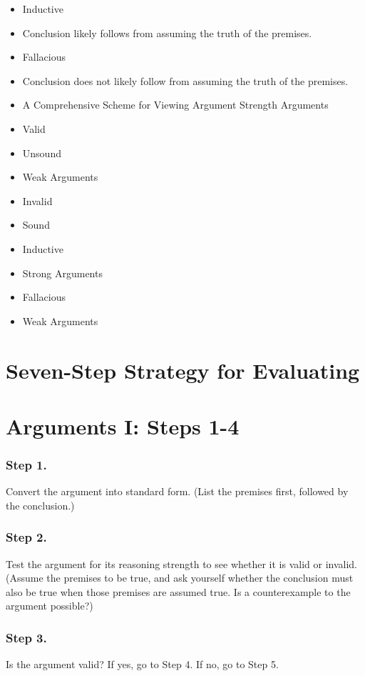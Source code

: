 \documentclass{article}
\begin{document}
      \begin{itemize}
        \item Inductive
        \item Conclusion likely follows from assuming the truth of the premises.
        \item Fallacious
        \item Conclusion does not likely follow from assuming the truth of the premises.
        \item A Comprehensive Scheme for Viewing Argument Strength Arguments
        \item Valid
        \item Unsound
        \item Weak Arguments
        \item Invalid
        \item Sound
        \item Inductive
        \item Strong Arguments
        \item Fallacious
        \item Weak Arguments

      \end{itemize}
  \section{Seven-Step Strategy for Evaluating}

  \section{Arguments I: Steps 1-4}

  \subsubsection{Step 1.}
Convert the argument into standard form. (List the premises first, followed by the conclusion.)

\subsubsection{Step 2.}
 Test the argument for its reasoning strength to see whether it is valid or invalid.
(Assume the premises to be true, and ask yourself whether the conclusion must also be true when those premises are assumed true. Is a counterexample to the argument possible?)

\subsubsection{Step 3.}
Is the argument valid?
If yes, go to Step 4.
If no, go to Step 5.
\end{document}
